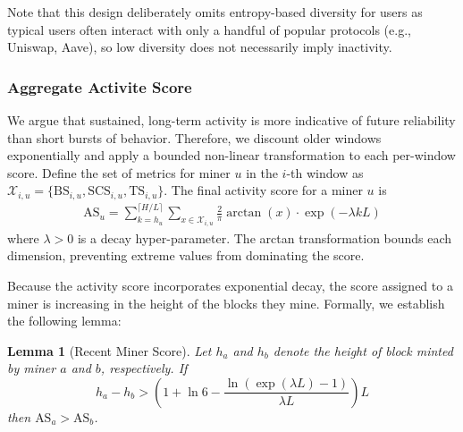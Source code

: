 \documentclass[journal]{IEEEtran}
\newtheorem{lemma}{Lemma}
\begin{document}
Note that this design deliberately omits entropy-based diversity for users as typical users often interact with only a handful of popular protocols (e.g., Uniswap, Aave), so low diversity does not necessarily imply inactivity.

\subsubsection{Aggregate Activite Score}

We argue that sustained, long-term activity is more indicative of future reliability than short bursts of behavior. Therefore, we discount older windows exponentially and apply a bounded non-linear transformation to each per-window score. Define the set of metrics for miner $ u $ in the $ i $-th window as $\mathcal{X}_{i,u}=\{\text{BS}_{i,u}, \text{SCS}_{i,u},\text{TS}_{i,u}\}$. The final activity score for a miner $u$ is
\begin{align}
    \text{AS}_u = \sum_{k = h_u}^{\lceil H/L \rceil} 
\sum_{x \in \mathcal{X}_{i,u}} \frac{2}{\pi} \arctan(x) \cdot \exp(-\lambda  k L)
\end{align}
where $\lambda > 0$ is a decay hyper-parameter. The arctan transformation bounds each dimension, preventing extreme values from dominating the score.

Because the activity score incorporates exponential decay, the score assigned to a miner is increasing in the height of the blocks they mine. Formally, we establish the following lemma:

\begin{lemma}[Recent Miner Score]
\label{lemma:recent-miner-score}
Let $h_a$ and $h_b$ denote the height of block minted by miner $a$ and $b$, respectively. If  
\begin{equation}
    h_a - h_b > (1 + \ln 6 - \frac{\ln(\exp(\lambda L) - 1)}{\lambda L}) L
\end{equation}
then $\text{AS}_a  > \text{AS}_b$.
\end{lemma}
\end{document}
